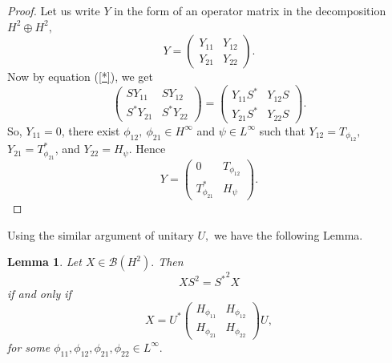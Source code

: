 \documentclass[12pt, reqno]{amsart}
\newtheorem{lemma}[theorem]{Lemma}
\theoremstyle{definition}
\theoremstyle{remark}
\numberwithin{equation}{section}
\begin{document}
            \begin{proof}
               Let us write $Y$ in the form of an operator matrix in the decomposition $H^2\oplus H^2,$
           \begin{equation*}
           Y=
               \begin{pmatrix}
                   Y_{11}&Y_{12}\\
                   Y_{21}&Y_{22}
               \end{pmatrix}.
           \end{equation*}
           Now by equation (\ref{*}), we get
           \begin{equation*}
                \begin{pmatrix}
                   SY_{11}&SY_{12}\\
                   S^*Y_{21}&S^*Y_{22}
               \end{pmatrix}
               =
               \begin{pmatrix}
                   Y_{11}S^*&Y_{12}S\\
                   Y_{21}S^*&Y_{22}S
               \end{pmatrix}.
           \end{equation*}
            So, $Y_{11}=0$, there exist  $\phi_{12},~ \phi_{21} \in H^\infty$ and $\psi \in L^\infty $ such that $Y_{12}=T_{\phi_{12}},$ $Y_{21}=T^*_{\phi_{21}}$, and $Y_{22}=H_{\psi}.$ Hence
            \begin{equation*}    
                Y=
                \begin{pmatrix}
                0&T_{\phi_{12}}\\
                T^*_{\phi_{21}}&H_\psi
                \end{pmatrix}.
            \end{equation*}
        \end{proof}
        Using the similar argument of unitary $U,$ we have the following Lemma.
        \begin{lemma}\label{special}
            Let $X \in \mathcal{B}(H^2).$ Then 
            $$XS^2={S^*}^2X$$ if and only if $$X=U^*
                \begin{pmatrix}
                H_{\phi_{11}}&H_{\phi_{12}}\\
                H_{\phi_{21}}&H_{\phi_{22}}
                \end{pmatrix}U,$$ 
                for some $\phi_{11}, \phi_{12}, \phi_{21}, \phi_{22} \in L^{\infty}.$
        \end{lemma}
\end{document}
